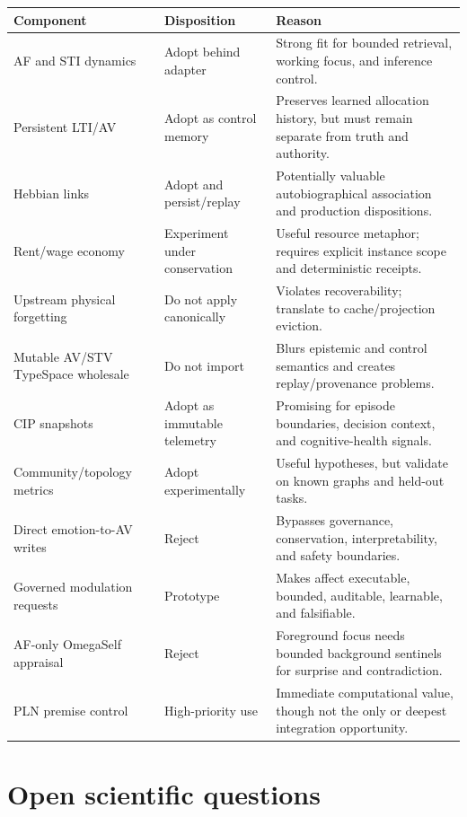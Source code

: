 \documentclass[11pt]{article}
\begin{document}
\begin{longtable}{p{}p{}p{}}
\toprule
\textbf{Component} & \textbf{Disposition} & \textbf{Reason} \\
\midrule
\endhead
AF and STI dynamics & Adopt behind adapter & Strong fit for bounded retrieval,
working focus, and inference control. \\
Persistent LTI/AV & Adopt as control memory & Preserves learned allocation
history, but must remain separate from truth and authority. \\
Hebbian links & Adopt and persist/replay & Potentially valuable autobiographical
association and production dispositions. \\
Rent/wage economy & Experiment under conservation & Useful resource metaphor;
requires explicit instance scope and deterministic receipts. \\
Upstream physical forgetting & Do not apply canonically & Violates recoverability;
translate to cache/projection eviction. \\
Mutable AV/STV TypeSpace wholesale & Do not import & Blurs epistemic and control
semantics and creates replay/provenance problems. \\
CIP snapshots & Adopt as immutable telemetry & Promising for episode boundaries,
decision context, and cognitive-health signals. \\
Community/topology metrics & Adopt experimentally & Useful hypotheses, but
validate on known graphs and held-out tasks. \\
Direct emotion-to-AV writes & Reject & Bypasses governance, conservation,
interpretability, and safety boundaries. \\
Governed modulation requests & Prototype & Makes affect executable, bounded,
auditable, learnable, and falsifiable. \\
AF-only OmegaSelf appraisal & Reject & Foreground focus needs bounded background
sentinels for surprise and contradiction. \\
PLN premise control & High-priority use & Immediate computational value, though
not the only or deepest integration opportunity. \\
\bottomrule
\end{longtable}

\section{Open scientific questions}
\end{document}
